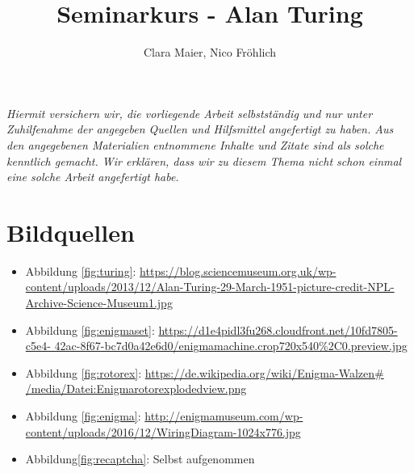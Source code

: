 \documentclass[11pt,a4paper]{article}
\author{Clara Maier, Nico Fröhlich}
\title{Seminarkurs - Alan Turing}
\renewcommand{\figurename}{Abbildung}
\newcommand{\picturesource}[2]{\item {\figurename} \ref{#1}: \href{#2}{#2}}
\begin{document}
\maketitle
\newpage
\emph{Hiermit versichern wir, die vorliegende Arbeit selbstständig und nur unter Zuhilfenahme der angegeben Quellen und Hilfsmittel angefertigt zu haben. Aus den angegebenen Materialien entnommene Inhalte und Zitate sind als solche kenntlich gemacht. Wir erklären, dass wir zu diesem Thema nicht schon einmal eine solche Arbeit angefertigt habe.}
\newpage

\tableofcontents
\newpage






\section*{Bildquellen}
{\renewcommand\labelitemi{}
\begin{itemize}
\picturesource{fig:turing}{https://blog.sciencemuseum.org.uk/wp-content/uploads/2013/12/Alan-Turing-29-March-1951-picture-credit-NPL-Archive-Science-Museum1.jpg}
\picturesource{fig:enigmaset}{https://d1e4pidl3fu268.cloudfront.net/10fd7805-c5e4-
42ac-8f67-bc7d0a42e6d0/enigma\textunderscore machine.crop\textunderscore 720x540\textunderscore 68\%2C0.preview.jpg}
\picturesource{fig:rotorex}{https://de.wikipedia.org/wiki/Enigma-Walzen\# /media/Datei:Enigma\textunderscore rotor\textunderscore exploded\textunderscore view.png}
\picturesource{fig:enigma}{http://enigmamuseum.com/wp-content/uploads/2016/12/WiringDiagram-1024x776.jpg}
\item \figurename \ref{fig:recaptcha}: Selbst aufgenommen
\end{itemize}
}



\end{document}
